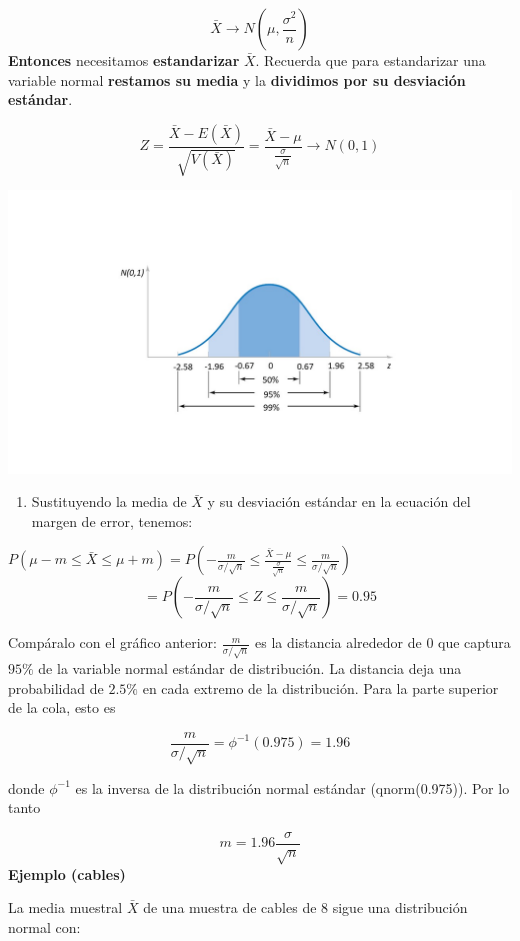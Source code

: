 \documentclass[
]{book}
\providecommand{\tightlist}{%
  \setlength{\itemsep}{0pt}\setlength{\parskip}{0pt}}
\begin{document}
\[\bar{X} \rightarrow N(\mu, \frac{\sigma^2}{n})\]
\textbf{Entonces} necesitamos \textbf{estandarizar} \(\bar{X}\). Recuerda que para estandarizar una variable normal \textbf{restamos su media} y la \textbf{dividimos por su desviación estándar}.

\[Z=\frac{\bar{X}-E(\bar{X})}{\sqrt{V(\bar{X})}} =\frac{\bar{X}-\mu}{ \frac{\sigma}{\sqrt{n}}} \rightarrow N(0,1)\]

\includegraphics{./figures/phi.JPG}

\begin{enumerate}
\def\labelenumi{\arabic{enumi}.}
\setcounter{enumi}{1}
\tightlist
\item
  Sustituyendo la media de \(\bar{X}\) y su desviación estándar en la ecuación del margen de error, tenemos:
\end{enumerate}

\(P(\mu-m \leq \bar{X} \leq\mu + m)=P(-\frac{m}{\sigma/\sqrt{n}} \leq \frac{\bar{X} -\mu}{\frac{\sigma}{\sqrt{n}}}\leq\frac{m}{\sigma/\sqrt{n}})\)
\[=P(-\frac{m}{\sigma/\sqrt{n}} \leq Z \leq\frac{m}{\sigma/\sqrt{n}})=0.95\]

Compáralo con el gráfico anterior: \(\frac{m}{\sigma/\sqrt{n}}\) es la distancia alrededor de \(0\) que captura \(95\%\) de la variable normal estándar de distribución. La distancia deja una probabilidad de \(2.5\%\) en cada extremo de la distribución. Para la parte superior de la cola, esto es

\[\frac{m}{\sigma/\sqrt{n}}=\phi^{-1}(0.975)=1.96\]

donde \(\phi^{-1}\) es la inversa de la distribución normal estándar (qnorm(0.975)). Por lo tanto

\[m=1.96 \frac{\sigma}{\sqrt{n}}\]
\textbf{Ejemplo (cables)}

La media muestral \(\bar{X}\) de una muestra de cables de \(8\) sigue una distribución normal con:
\end{document}
